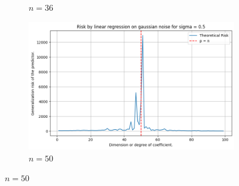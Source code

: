 \documentclass[10pt,oneside,oldfontcommands,dvipsnames,article]{memoir}
\begin{document}
\begin{figure}[htb]
\begin{subfigure}[b]{\imgwidth}
    \caption{$n=36$}\label{fig:1c2}
  \end{subfigure}%
  \hfill
  \begin{subfigure}[b]{\imgwidth}
    \includegraphics[width=\linewidth]{img/descent_devel4.png}
    \caption{$n=50$}\label{fig:1d2}
  \end{subfigure}

  \medskip


\end{figure}
\end{document}
